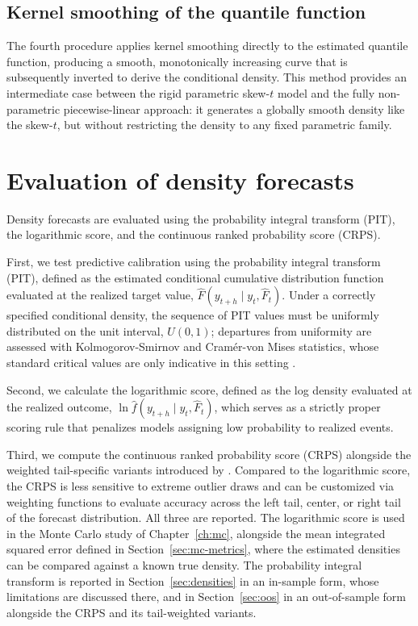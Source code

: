 \documentclass[12pt]{report} %
\begin{document}
\subsection{Kernel smoothing of the quantile function}
\label{subsec:kernel}

The fourth procedure applies kernel smoothing directly to the estimated quantile function, producing a smooth, monotonically increasing curve that is subsequently inverted to derive the conditional density. This method provides an intermediate case between the rigid parametric skew-$t$ model and the fully non-parametric piecewise-linear approach: it generates a globally smooth density like the skew-$t$, but without restricting the density to any fixed parametric family.

\section{Evaluation of density forecasts}
\label{sec:evaluation}

Density forecasts are evaluated using the probability integral transform (PIT), the logarithmic score, and the continuous ranked probability score (CRPS).

First, we test predictive calibration using the probability integral transform (PIT), defined as the estimated conditional cumulative distribution function evaluated at the realized target value, $\hat{F}(y_{t+h} \mid y_t, \hat{F}_t)$. Under a correctly specified conditional density, the sequence of PIT values must be uniformly distributed on the unit interval, $U(0, 1)$; departures from uniformity are assessed with Kolmogorov-Smirnov and Cramér-von Mises statistics, whose standard critical values are only indicative in this setting \parencite{rossi2019alternative}.

Second, we calculate the logarithmic score, defined as the log density evaluated at the realized outcome, $\ln \hat{f}(y_{t+h} \mid y_t, \hat{F}_t)$, which serves as a strictly proper scoring rule that penalizes models assigning low probability to realized events.

Third, we compute the continuous ranked probability score (CRPS) alongside the weighted tail-specific variants introduced by \textcite{gneiting2011comparing}. Compared to the logarithmic score, the CRPS is less sensitive to extreme outlier draws and can be customized via weighting functions to evaluate accuracy across the left tail, center, or right tail of the forecast distribution. All three are reported. The logarithmic score is used in the Monte Carlo study of Chapter~\ref{ch:mc}, alongside the mean integrated squared error defined in Section~\ref{sec:mc-metrics}, where the estimated densities can be compared against a known true density. The probability integral transform is reported in Section~\ref{sec:densities} in an in-sample form, whose limitations are discussed there, and in Section~\ref{sec:oos} in an out-of-sample form alongside the CRPS and its tail-weighted variants.
\end{document}
